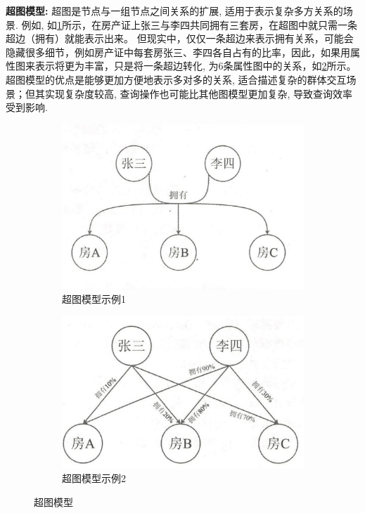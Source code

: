 \textbf{超图模型:} 超图是节点与一组节点之间关系的扩展, 适用于表示复杂多方关系的场景. 例如, 如\cref{fig:hypergraph1}所示，在房产证上张三与李四共同拥有三套房，在超图中就只需一条超边（拥有）就能表示出来。 但现实中，仅仅一条超边来表示拥有关系，可能会隐藏很多细节，例如房产证中每套房张三、李四各自占有的比率，因此，如果用属性图来表示将更为丰富，只是将一条超边转化, 为6条属性图中的关系，如\cref{fig:hypergraph2}所示。 超图模型的优点是能够更加方便地表示多对多的关系, 适合描述复杂的群体交互场景；但其实现复杂度较高, 查询操作也可能比其他图模型更加复杂, 导致查询效率受到影响.
\begin{figure}[H]
	\centering
	\begin{subfigure}[b]{0.45\textwidth}
		\centering
		\includegraphics[width=1\textwidth]{images/16.png}
		\caption{超图模型示例1}
		\label{fig:hypergraph1}
	\end{subfigure}
	\begin{subfigure}[b]{0.45\textwidth}
		\centering
		\includegraphics[width=1\textwidth]{images/17.png}
		\caption{超图模型示例2}
		\label{fig:hypergraph2}
	\end{subfigure}
	\caption{超图模型}
	\label{fig:hypergraph}
\end{figure}



